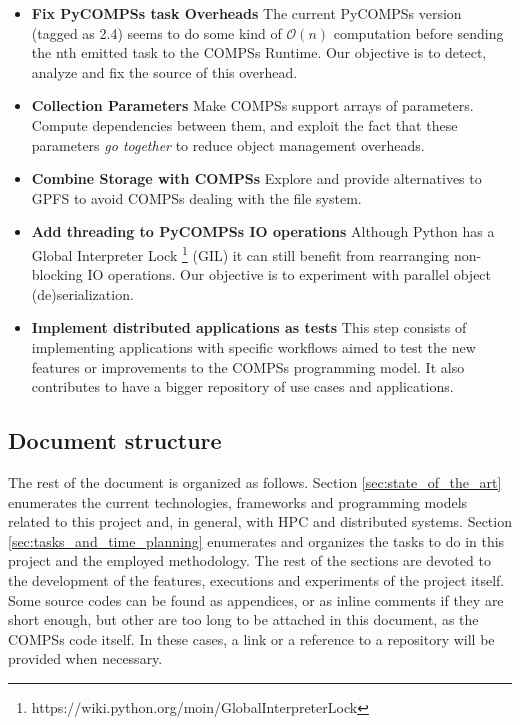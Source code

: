 \begin{itemize}
\item \textbf{Fix PyCOMPSs task Overheads} The current PyCOMPSs version (tagged as 2.4) seems to do some kind of $\mathcal{O}(n)$ computation before sending the nth emitted task to the COMPSs Runtime. Our objective is to detect, analyze and fix the source of this overhead.
\item \textbf{Collection Parameters} Make COMPSs support arrays of parameters. Compute dependencies between them, and exploit the fact that these parameters \textit{go together} to reduce object management overheads.
\item \textbf{Combine Storage with COMPSs} Explore and provide alternatives to GPFS to avoid COMPSs dealing with the file system. 
\item \textbf{Add threading to PyCOMPSs IO operations} Although Python has a Global Interpreter Lock \footnote{https://wiki.python.org/moin/GlobalInterpreterLock} (GIL) it can still benefit from rearranging non-blocking IO operations. Our objective is to experiment with parallel object (de)serialization.
\item \textbf{Implement distributed applications as tests} This step consists of implementing applications with specific workflows aimed to test the new features or improvements to the COMPSs programming model. It also contributes to have a bigger repository of use cases and applications.
\end{itemize}


\subsection{Document structure}
\label{subsec:document_structure}
The rest of the document is organized as follows. Section \ref{sec:state_of_the_art} enumerates the current technologies, frameworks and programming models related to this project and, in general, with HPC and distributed systems. Section \ref{sec:tasks_and_time_planning} enumerates and organizes the tasks to do in this project and the employed methodology. The rest of the sections are devoted to the development of the features, executions and experiments of the project itself. Some source codes can be found as appendices, or as inline comments if they are short enough, but other are too long to be attached in this document, as the COMPSs code itself. In these cases, a link or a reference to a repository will be provided when necessary.